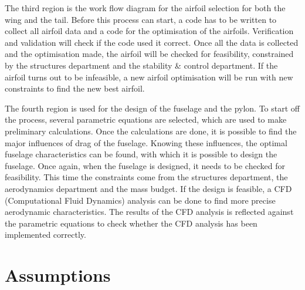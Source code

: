 The third region is the work flow diagram for the airfoil selection for both the wing and the tail. Before this process can start, a code has to be written to collect all airfoil data and a code for the optimisation of the airfoils. Verification and validation will check if the code used it correct. Once all the data is collected and the optimisation made, the airfoil will be checked for feasibility, constrained by the structures department and the stability \& control department. If the airfoil turns out to be infeasible, a new airfoil optimisation will be run with new constraints to find the new best airfoil.

The fourth region is used for the design of the fuselage and the pylon. To start off the process, several parametric equations are selected, which are used to make preliminary calculations. Once the calculations are done, it is possible to find the major influences of drag of the fuselage. Knowing these influences, the optimal fuselage characteristics can be found, with which it is possible to design the fuselage. Once again, when the fuselage is designed, it needs to be checked for feasibility. This time the constraints come from the structures department, the aerodynamics department and the mass budget. If the design is feasible, a CFD (Computational Fluid Dynamics) analysis can be done to find more precise aerodynamic characteristics. The results of the CFD analysis is reflected against the parametric equations to check whether the CFD analysis has been implemented correctly.

\section{Assumptions}


